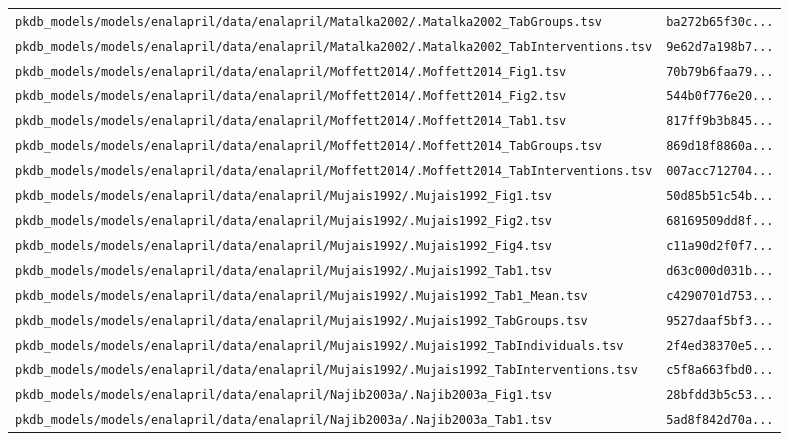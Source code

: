 \documentclass{article}
\begin{document}
\begin{longtable}{ll}
\texttt{pkdb\_models/models/enalapril/data/enalapril/Matalka2002/.Matalka2002\_TabGroups.tsv} & \texttt{ba272b65f30c...} \\
\texttt{pkdb\_models/models/enalapril/data/enalapril/Matalka2002/.Matalka2002\_TabInterventions.tsv} & \texttt{9e62d7a198b7...} \\
\texttt{pkdb\_models/models/enalapril/data/enalapril/Moffett2014/.Moffett2014\_Fig1.tsv} & \texttt{70b79b6faa79...} \\
\texttt{pkdb\_models/models/enalapril/data/enalapril/Moffett2014/.Moffett2014\_Fig2.tsv} & \texttt{544b0f776e20...} \\
\texttt{pkdb\_models/models/enalapril/data/enalapril/Moffett2014/.Moffett2014\_Tab1.tsv} & \texttt{817ff9b3b845...} \\
\texttt{pkdb\_models/models/enalapril/data/enalapril/Moffett2014/.Moffett2014\_TabGroups.tsv} & \texttt{869d18f8860a...} \\
\texttt{pkdb\_models/models/enalapril/data/enalapril/Moffett2014/.Moffett2014\_TabInterventions.tsv} & \texttt{007acc712704...} \\
\texttt{pkdb\_models/models/enalapril/data/enalapril/Mujais1992/.Mujais1992\_Fig1.tsv} & \texttt{50d85b51c54b...} \\
\texttt{pkdb\_models/models/enalapril/data/enalapril/Mujais1992/.Mujais1992\_Fig2.tsv} & \texttt{68169509dd8f...} \\
\texttt{pkdb\_models/models/enalapril/data/enalapril/Mujais1992/.Mujais1992\_Fig4.tsv} & \texttt{c11a90d2f0f7...} \\
\texttt{pkdb\_models/models/enalapril/data/enalapril/Mujais1992/.Mujais1992\_Tab1.tsv} & \texttt{d63c000d031b...} \\
\texttt{pkdb\_models/models/enalapril/data/enalapril/Mujais1992/.Mujais1992\_Tab1\_Mean.tsv} & \texttt{c4290701d753...} \\
\texttt{pkdb\_models/models/enalapril/data/enalapril/Mujais1992/.Mujais1992\_TabGroups.tsv} & \texttt{9527daaf5bf3...} \\
\texttt{pkdb\_models/models/enalapril/data/enalapril/Mujais1992/.Mujais1992\_TabIndividuals.tsv} & \texttt{2f4ed38370e5...} \\
\texttt{pkdb\_models/models/enalapril/data/enalapril/Mujais1992/.Mujais1992\_TabInterventions.tsv} & \texttt{c5f8a663fbd0...} \\
\texttt{pkdb\_models/models/enalapril/data/enalapril/Najib2003a/.Najib2003a\_Fig1.tsv} & \texttt{28bfdd3b5c53...} \\
\texttt{pkdb\_models/models/enalapril/data/enalapril/Najib2003a/.Najib2003a\_Tab1.tsv} & \texttt{5ad8f842d70a...} \\

\end{longtable}
\end{document}
